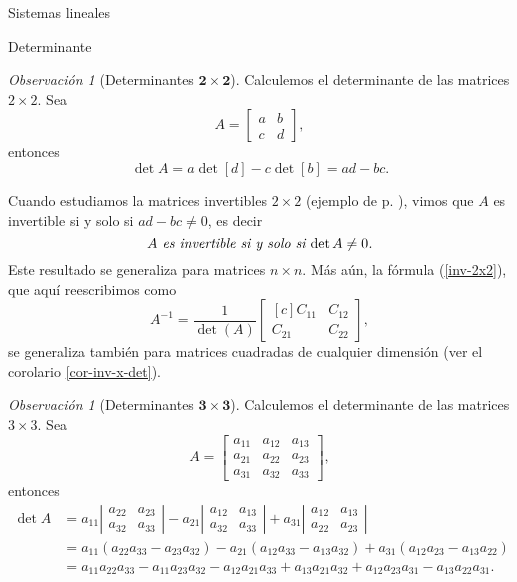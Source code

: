 \documentclass[a4paper,12pt,twoside,spanish,reqno]{amsbook}
\numberwithin{equation}{section}
\theoremstyle{definition}
\theoremstyle{remark}
\newtheorem*{observacion*}{Observaci\'on}
\newtheorem*{obs*}{Observaci\'on}
\newcommand{\C}{\mathbb C}
\begin{document}
\begin{chapter}{Sistemas lineales}
\begin{section}{Determinante}
    \begin{obs*}[{\sc Determinantes $\mathbf{2 \times 2}$}] Calculemos el determinante de las matrices $2 \times 2$. Sea 
        $$A=\begin{bmatrix}a&b\\c&d\end{bmatrix},$$  entonces
        $$
        \det A = a \det [d] - c \det [b] = ad-bc.
        $$
        
       Cuando estudiamos la matrices invertibles $2\times 2$ (ejemplo de p. \pageref{inv-2x2-0}), vimos que $A$ es invertible si y solo si $ ad-bc \not=0$,  es decir 
        \begin{equation}
        \text{\textit{$A$ es invertible si y solo si $ \det A \not=0$.}}
        \end{equation}
        Este resultado se generaliza para matrices $n \times n$. Más aún, la fórmula (\ref{inv-2x2}),  que aquí reescribimos como
        \begin{equation*}
            A^{-1} = \dfrac{1}{\det(A)}
            \begin{bmatrix*}[c]C_{11}&C_{12}\\C_{21}&C_{22}\end{bmatrix*},
        \end{equation*} se generaliza también para matrices cuadradas de cualquier dimensión (ver el corolario \ref{cor-inv-x-det}).
    \end{obs*}
    
    
    \begin{observacion*}[{\sc Determinantes $\mathbf{3 \times 3}$}]  Calculemos el determinante de las matrices $3 \times 3$. Sea 
        $$A=\begin{bmatrix}a_{11}&a_{12}&a_{13}\\a_{21}&a_{22}&a_{23}\\a_{31}&a_{32}&a_{33}\end{bmatrix},$$  entonces
        \begin{align*}
        \det A &= a_{11}\left|\begin{matrix}a_{22}&a_{23}\\a_{32}&a_{33}\end{matrix}\right|
        - a_{21}\left|\begin{matrix}a_{12}&a_{13}\\a_{32}&a_{33}\end{matrix}\right|
        + a_{31}\left|\begin{matrix}a_{12}&a_{13}\\a_{22}&a_{23}\end{matrix}\right|\\
        &= a_{11}(a_{22}a_{33}- a_{23}a_{32})
        - a_{21}(a_{12}a_{33}-a_{13}a_{32}) 
        + a_{31}(a_{12}a_{23} - a_{13}a_{22}) \\
        &=a_{11}a_{22}a_{33}- a_{11}a_{23}a_{32} 
        - a_{12}a_{21}a_{33}+ a_{13}a_{21}a_{32}+ a_{12}a_{23}a_{31}
        - a_{13}a_{22}a_{31}.	
        \end{align*}
        

\end{observacion*}
\end{section}
\end{chapter}
\end{document}
